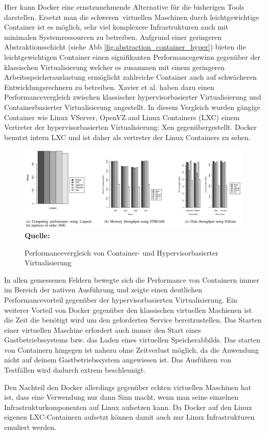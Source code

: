 Hier kann Docker eine ernstzunehmende Alternative für die bisherigen Tools darstellen. Ersetzt man die \grq schweren\grq\ virtuellen Maschinen durch leichtgewichtige Container ist es möglich, sehr viel komplexere Infrastrukturen auch mit minimalen Systemressourcen zu betreiben.
Aufgrund einer geringeren Abstraktionsschicht (siehe Abb \ref{fig:abstraction_container_hyper}) bieten die leichtgewichtigen Container einen signifikanten Performancegewinn gegenüber der klassischen Virtualisierung welcher es zusammen mit einem geringeren Arbeitsspeicherauslastung ermöglicht zahlreiche Container auch auf schwächeren Entwicklungsrechnern zu betreiben.
Xavier et al. \cite{miguel_g._xavier_performance_2014} haben dazu einen Performancevergleich zwischen klassischer hypervisorbasierter Virtualisierung und Containerbasierter Virtualisierung angestellt.
In diesem Vergleich wurden gängige Container  wie Linux VServer, OpenVZ and Linux Containers (LXC) einem Vertreter der hypervisorbasierten Virtualisierung: Xen gegenübergestellt.
Docker benutzt intern LXC und ist daher als vertreter der Linux Containers zu sehen.
\begin{figure}[htbp]
  \centering  
  \includegraphics[scale=0.5]{img/performanceBenchmarks.JPG}\\
  \footnotesize\sffamily\textbf{Quelle:} \cite{miguel_g._xavier_performance_2014}
  \caption{Performancevergleich von Container- und Hypervisorbasierter Virtualisierung}
  \label{fig:performance_container_hyper}
\end{figure}
In allen gemessenen Feldern bewegte sich die Performance von Containern immer im Bereich der nativen Ausführung und zeigte einen deutlichen Performancevorteil gegenüber der hypervisorbasierten Virtualisierung. 
Ein weiterer Vorteil von Docker gegenüber den klassischen virtuellen Machienen ist die Zeit die benötigt wird um den geforderten Service bereitzustellen. Das Starten einer virtuellen Maschine erfordert auch immer den Start eines Gastbetriebssystems bzw. das Laden eines virtuellen Speicherabbilds. Das starten von Containern hingegen ist nahezu ohne Zeitverlust möglich, da die Anwendung nicht auf deinem Gastbetriebssystem angewiesen ist.
Das Ausführen von Testfällen wird dadurch extrem beschleunigt.


Den Nachteil den Docker allerdings gegenüber echten virtuellen Maschinen hat ist, dass eine Verwendung nur dann Sinn macht, wenn man seine einzelnen Infrastrukturkomponenten auf Linux aufsetzen kann. Da Docker auf den Linux eigenen LXC-Containern aufsetzt können damit auch nur Linux Infrastrukturen emuliert werden.
